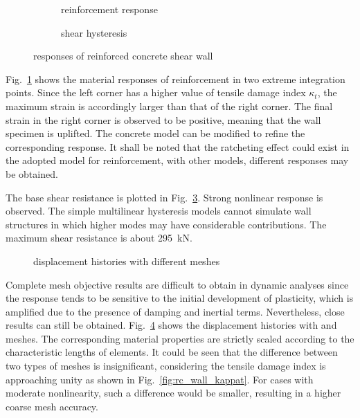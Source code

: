 \documentclass[3p,sort&compress,review,11pt,fleqn]{elsarticle}
\newcommand*{\figref}[1]{Fig.~\ref{#1}}
\begin{document}
\begin{figure}[htb]
\centering\scriptsize
\begin{subfigure}{.49\textwidth}\centering

\caption{reinforcement response}\label{fig:rc_wall_rebar}
\end{subfigure}\hfill
\begin{subfigure}{.49\textwidth}\centering

\caption{shear hysteresis}\label{fig:rc_wall_shear}
\end{subfigure}
\caption{responses of reinforced concrete shear wall}
\end{figure}
\figref{fig:rc_wall_rebar} shows the material responses of reinforcement in two extreme integration points. Since the left corner has a higher value of tensile damage index $\kappa_t$, the maximum strain is accordingly larger than that of the right corner. The final strain in the right corner is observed to be positive, meaning that the wall specimen is uplifted. The concrete model can be modified to refine the corresponding response. It shall be noted that the ratcheting effect could exist in the adopted model for reinforcement, with other models, different responses may be obtained.

The base shear resistance is plotted in \figref{fig:rc_wall_shear}. Strong nonlinear response is observed. The simple multilinear hysteresis models cannot simulate wall structures in which higher modes may have considerable contributions. The maximum shear resistance is about \SI{295}{\kilo\newton}.

\begin{figure}[htb]
\centering\scriptsize

\caption{displacement histories with different meshes}\label{fig:rc_wall_mesh}
\end{figure}
Complete mesh objective results are difficult to obtain in dynamic analyses since the response tends to be sensitive to the initial development of plasticity, which is amplified due to the presence of damping and inertial terms. Nevertheless, close results can still be obtained. \figref{fig:rc_wall_mesh} shows the displacement histories with  and  meshes. The corresponding material properties are strictly scaled according to the characteristic lengths of elements. It could be seen that the difference between two types of meshes is insignificant, considering the tensile damage index is approaching unity as shown in \figref{fig:rc_wall_kappat}. For cases with moderate nonlinearity, such a difference would be smaller, resulting in a higher coarse mesh accuracy.
\end{document}
